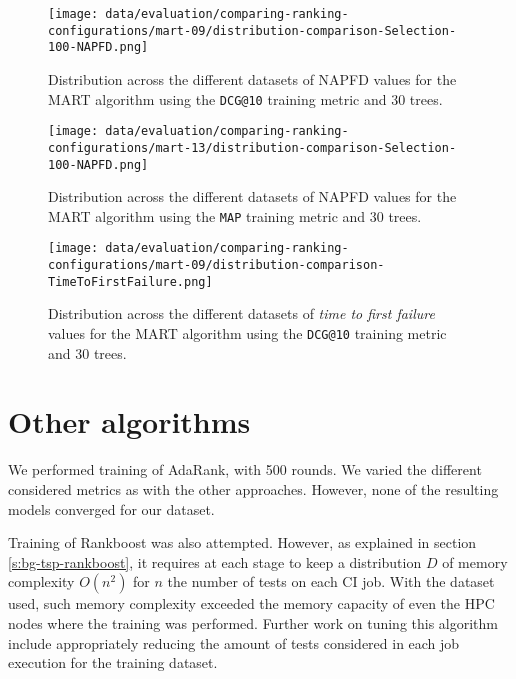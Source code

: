 \begin{figure}
    \centering
    \begin{minipage}{.45\textwidth}
        \centering
        \label{fig:mart-09-napfd}
        \texttt{[image: data/evaluation/comparing-ranking-configurations/mart-09/distribution-comparison-Selection-100-NAPFD.png]}
        \parbox{0.9\textwidth}{\caption{Distribution across the different datasets of NAPFD values for the MART algorithm using the \texttt{DCG@10} training metric and 30 trees.}}
    \end{minipage}%
    \begin{minipage}{.45\textwidth}
        \centering
        \label{fig:mart-13-napfd}
        \texttt{[image: data/evaluation/comparing-ranking-configurations/mart-13/distribution-comparison-Selection-100-NAPFD.png]}
        \parbox{0.9\textwidth}{\caption{Distribution across the different datasets of NAPFD values for the MART algorithm using the \texttt{MAP} training metric and 30 trees.}}
    \end{minipage}%
\end{figure}
\begin{figure}
    \centering
    \begin{minipage}{.45\textwidth}
        \centering
        \label{fig:mart-09-tff}
        \texttt{[image: data/evaluation/comparing-ranking-configurations/mart-09/distribution-comparison-TimeToFirstFailure.png]}
        \parbox{0.9\textwidth}{\caption{Distribution across the different datasets of \emph{time to first failure} values for the MART algorithm using the \texttt{DCG@10} training metric and 30 trees.}}
    \end{minipage}%
\end{figure}

\section{Other algorithms}

We performed training of AdaRank, with 500 rounds. We varied the different considered metrics as with
the other approaches. However, none of the resulting models converged for our dataset.

Training of Rankboost was also attempted. However, as explained in section \ref{s:bg-tsp-rankboost},
it requires at each stage to keep a distribution $D$ of memory complexity $O(n^2)$ for $n$ the number of tests
on each CI job. With the dataset used, such memory complexity exceeded the memory capacity of even the HPC nodes 
where the training was performed. Further work on tuning this algorithm include appropriately reducing the amount 
of tests considered in each job execution for the training dataset.
